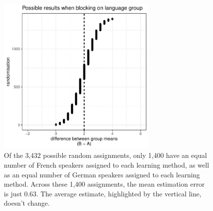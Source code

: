 \documentclass[a4paper]{tufte-book}\usepackage[]{graphicx}\usepackage[]{xcolor}
\begin{document}
\begin{figure}
  \centering
  \includegraphics[width = 0.7\textwidth]{figure/dutch3-1}
  \caption{Of the 3,432 possible random assignments, only 1,400 have an equal number of French speakers assigned to each learning method, as well as an equal number of German speakers assigned to each learning method. Across these 1,400 assignments, the mean estimation error is just 0.63. The average estimate, highlighted by the vertical line, doesn't change.}
  \label{fig:dutch3}
\end{figure}

%
%
%
\end{document}
